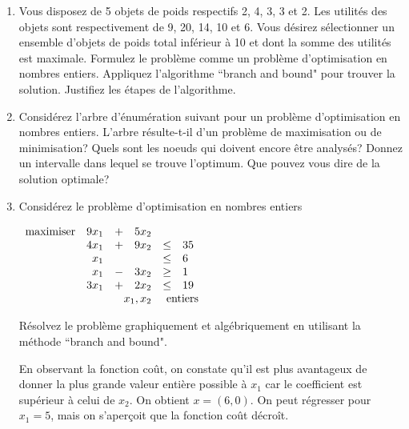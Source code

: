 \begin{enumerate}
  \item Vous disposez de 5 objets de poids respectifs 2, 4, 3, 3 et 2. Les
    utilités des objets sont respectivement de 9, 20, 14, 10 et 6. Vous désirez
    sélectionner un ensemble d'objets de poids total inférieur  à 10
    et dont la somme des utilités est maximale.  Formulez le problème
    comme un problème d'optimisation en nombres entiers. Appliquez l'algorithme ``branch and bound" pour trouver la
    solution. Justifiez les étapes de l'algorithme.


    \begin{solution}
    \end{solution}

  \item  Considérez l'arbre d'énumération suivant pour un problème d'optimisation en nombres entiers. L'arbre
    résulte-t-il d'un problème de maximisation ou de minimisation?  Quels sont les noeuds qui doivent encore être analysés? Donnez
    un intervalle dans lequel se trouve l'optimum. Que pouvez vous dire de la solution optimale?








    \begin{solution}
    \end{solution}

  \item Considérez le problème d'optimisation en nombres entiers

    $
    \begin{array}{lrcrcl}
      \maxi & 9x_1 & +&  5 x_2\\
      & 4 x_1 &+& 9 x_2  & \leq & 35 \\
      & x_1    &  &       &  \leq & 6\\
      &   x_1& -&  3x_2  & \geq & 1 \\
      & 3 x_1    & + & 2x_2   &  \leq & 19\\
      &   \multicolumn{3}{r}{x_1, x_2}  & \multicolumn{2}{l}{\mbox{ entiers}}
    \end{array}
    $


    Résolvez le problème graphiquement et algébriquement en utilisant la méthode ``branch and bound".



    \begin{solution}
      En observant la fonction coût, on constate qu'il est plus avantageux de donner la plus grande valeur entière possible à $x_{1}$ car le coefficient est supérieur à celui de $x_{2}$. On obtient $x = (6,0)$. On peut régresser pour $x_{1} = 5$, mais on s'aperçoit que la fonction coût décroît.
    \end{solution}


\end{enumerate}
